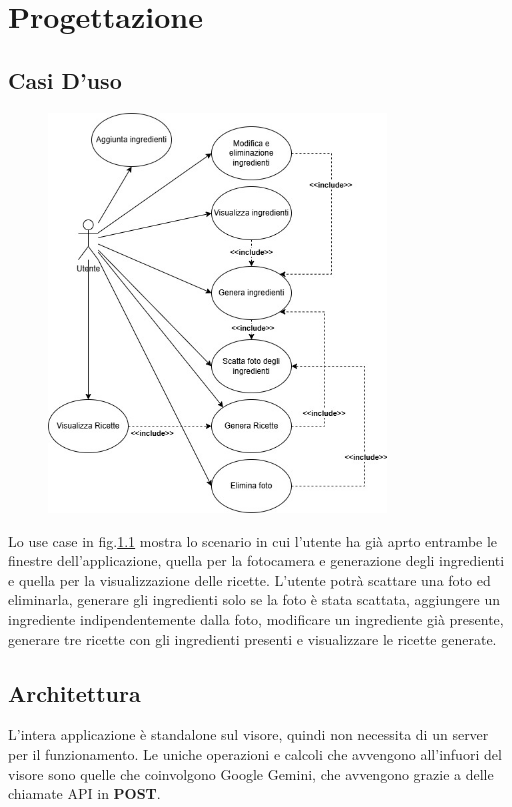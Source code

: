 \chapter{Progettazione}
\pagestyle{plain}

\section{Casi D'uso}
\begin{figure}[H]
    \centering
    \includegraphics[width=0.8\textwidth,height=\textheight,keepaspectratio]{figures/chapter_1/use_case.jpg}
    \caption{}
    \label{fig:use_case}
\end{figure}

Lo use case in fig.\ref{fig:use_case} mostra lo scenario in cui l'utente ha già aprto entrambe le finestre dell'applicazione, quella per la fotocamera e generazione degli ingredienti e quella per la visualizzazione delle ricette. L'utente potrà scattare una foto ed eliminarla, generare gli ingredienti solo se la foto è stata scattata, aggiungere un ingrediente indipendentemente dalla foto, modificare un ingrediente già presente, generare tre ricette con gli ingredienti presenti e visualizzare le ricette generate.

\section{Architettura}
L'intera applicazione è standalone sul visore, quindi non necessita di un server per il funzionamento. Le uniche operazioni e calcoli che avvengono all'infuori del visore sono quelle che coinvolgono Google Gemini, che avvengono grazie a delle chiamate API in \textbf{POST}.
